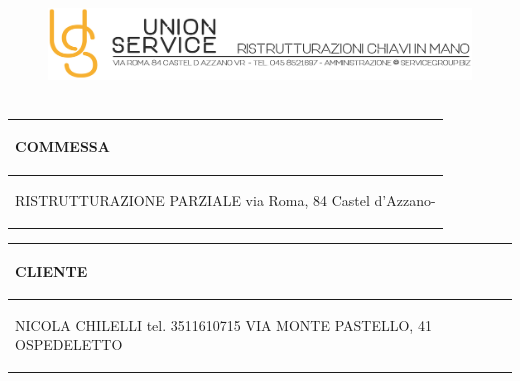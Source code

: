 \documentclass[a4paper]{article}
\begin{document}
                                \begin{figure}[!t]
                                \includegraphics[width=15.8cm, height=3cm]{intestazioneAlta2.jpg}
                                \end{figure}

                                \noindent\begin{tabular}{| L{72.2mm} |}
                                    \hline
                                    \vspace{2.5mm}
                                    \begin{spacing}{0}
                                    \textbf{COMMESSA}
                                    \end{spacing}\\
                                    \hline
                                    \vspace{4mm}
                                    \begin{spacing}{1.2}

                                RISTRUTTURAZIONE PARZIALE \newline via Roma, 84 \newline Castel d'Azzano\newline -
                                  \end{spacing}\\
                                    \hline
                                  \end{tabular}
                                  \quad
                                  \begin{tabular}{ | R{72.2mm} | }
                                    \hline
                                    \vspace{2.5mm}
                                    \begin{spacing}{0}
                                    \textbf{CLIENTE}
                                    \end{spacing}\\
                                    \hline
                                    \vspace{4mm}
                                    \begin{spacing}{1.2}

                               NICOLA CHILELLI \newline tel. 3511610715 \newline VIA MONTE PASTELLO, 41 OSPEDELETTO
                                  \end{spacing}\\
                                    \hline
                                  \end{tabular}
\end{document}
